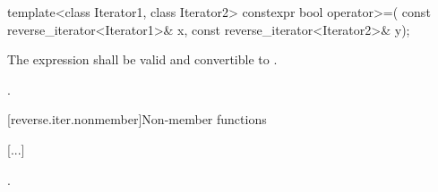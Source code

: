 %
\begin{itemdecl}
template<class Iterator1, class Iterator2>
  constexpr bool operator>=(
    const reverse_iterator<Iterator1>& x,
    const reverse_iterator<Iterator2>& y);
\end{itemdecl}

\begin{itemdescr}
\begin{addedblock}
\pnum
\constraints
The expression  shall be valid and
convertible to .
\end{addedblock}

\pnum
\returns
{}.
\end{itemdescr}

[reverse.iter.nonmember]{Non-member functions}

[...]

\setcounter{Paras}{1}
\begin{itemdescr}
\pnum
\returns
{}.
\end{itemdescr}

